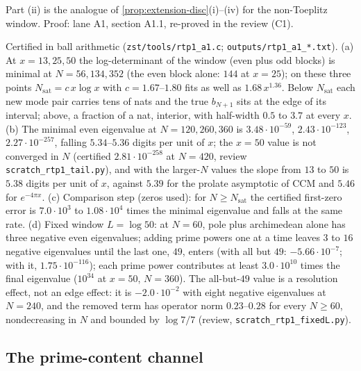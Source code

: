 Part (ii) is the analogue of \cref{prop:extension-disc}(i)--(iv) for the non-Toeplitz window. Proof: lane A1,
section A1.1, re-proved in the review (C1).

\begin{numerical}
\label{num:rtp-dilation-channel}
Certified in ball arithmetic (\texttt{zst/tools/rtp1\_a1.c}; \texttt{outputs/rtp1\_a1\_*.txt}). (a) At
$x = 13, 25, 50$ the log-determinant of the window (even plus odd blocks) is minimal at $N = 56, 134, 352$
(the even block alone: $144$ at $x = 25$); on these three points $N_{\mathrm{sat}} = c\,x\log x$ with $c = 1.67$--$1.80$
fits as well as $1.68\,x^{1.36}$. Below $N_{\mathrm{sat}}$ each new mode pair carries tens of nats and the true
$b_{N+1}$ sits at the edge of its interval; above, a fraction of a nat, interior, with half-width $0.5$ to $3.7$
at every $x$. (b) The minimal even eigenvalue at $N = 120, 260, 360$ is $3.48\cdot10^{-59}$, $2.43\cdot10^{-123}$,
$2.27\cdot10^{-257}$, falling $5.34$--$5.36$ digits per unit of $x$; the $x = 50$ value is not converged in $N$
(certified $2.81\cdot10^{-258}$ at $N = 420$, review \texttt{scratch\_rtp1\_tail.py}), and with the larger-$N$
values the slope from $13$ to $50$ is $5.38$ digits per unit of $x$, against $5.39$ for the prolate asymptotic of CCM and $5.46$ for
$e^{-4\pi x}$. (c) Comparison step (zeros used): for $N\ge N_{\mathrm{sat}}$ the certified first-zero error is
$7.0\cdot10^3$ to $1.08\cdot10^4$ times the minimal eigenvalue and falls at the same rate. (d) Fixed window
$L = \log50$: at $N = 60$, pole plus archimedean alone has three negative even eigenvalues; adding prime powers one
at a time leaves $3$ to $16$ negative eigenvalues until the last one, $49$, enters (with all but $49$:
$-5.66\cdot10^{-7}$; with it, $1.75\cdot10^{-116}$); each prime power contributes at least $3.0\cdot10^{10}$ times
the final eigenvalue ($10^{34}$ at $x = 50$, $N = 360$). The all-but-$49$ value is a resolution effect, not an
edge effect: it is $-2.0\cdot10^{-2}$ with eight negative eigenvalues at $N = 240$, and the removed term has
operator norm $0.23$--$0.28$ for every $N\ge60$, nondecreasing in $N$ and bounded by $\log7/7$ (review,
\texttt{scratch\_rtp1\_fixedL.py}).
\end{numerical}

\subsection{The prime-content channel}

